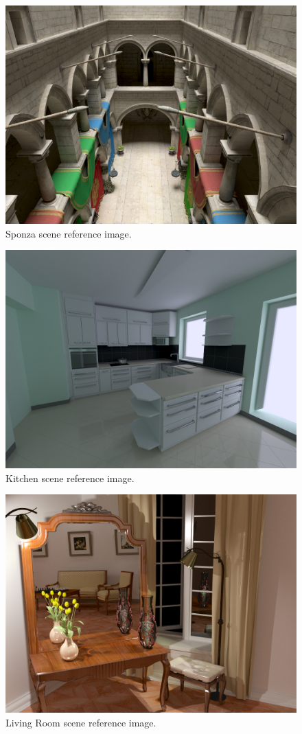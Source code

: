 \begin{figure}[H]
\centering
\includegraphics[width=0.8\linewidth]{img/sponza_ref.jpg}
\caption{\label{img:sponza_ref} Sponza scene reference image.}
\end{figure}


\begin{figure}[H]
\centering
\includegraphics[width=0.8\linewidth]{img/kitchen_ref.jpg}
\caption{\label{img:kitchen_ref} Kitchen scene reference image.}
\end{figure}


\begin{figure}[H]
\centering
\includegraphics[width=0.8\linewidth]{img/livingroom_ref.jpg}
\caption{\label{img:livingroom_ref} Living Room scene reference image.}
\end{figure}



